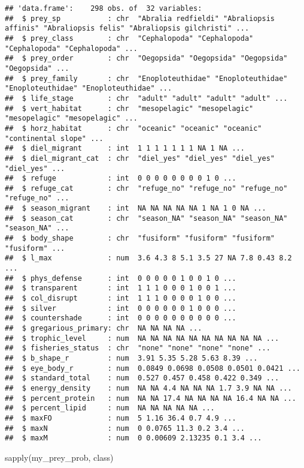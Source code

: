 \documentclass[
]{article}
\newenvironment{Shaded}{\begin{snugshade}}{\end{snugshade}}
\newcommand{\FunctionTok}[1]{\textcolor[rgb]{0.00,0.00,0.00}{#1}}
\newcommand{\NormalTok}[1]{#1}
\begin{document}
\begin{verbatim}
## 'data.frame':    298 obs. of  32 variables:
##  $ prey_sp           : chr  "Abralia redfieldi" "Abraliopsis affinis" "Abraliopsis felis" "Abraliopsis gilchristi" ...
##  $ prey_class        : chr  "Cephalopoda" "Cephalopoda" "Cephalopoda" "Cephalopoda" ...
##  $ prey_order        : chr  "Oegopsida" "Oegopsida" "Oegopsida" "Oegopsida" ...
##  $ prey_family       : chr  "Enoploteuthidae" "Enoploteuthidae" "Enoploteuthidae" "Enoploteuthidae" ...
##  $ life_stage        : chr  "adult" "adult" "adult" "adult" ...
##  $ vert_habitat      : chr  "mesopelagic" "mesopelagic" "mesopelagic" "mesopelagic" ...
##  $ horz_habitat      : chr  "oceanic" "oceanic" "oceanic" "continental slope" ...
##  $ diel_migrant      : int  1 1 1 1 1 1 1 NA 1 NA ...
##  $ diel_migrant_cat  : chr  "diel_yes" "diel_yes" "diel_yes" "diel_yes" ...
##  $ refuge            : int  0 0 0 0 0 0 0 0 1 0 ...
##  $ refuge_cat        : chr  "refuge_no" "refuge_no" "refuge_no" "refuge_no" ...
##  $ season_migrant    : int  NA NA NA NA NA 1 NA 1 0 NA ...
##  $ season_cat        : chr  "season_NA" "season_NA" "season_NA" "season_NA" ...
##  $ body_shape        : chr  "fusiform" "fusiform" "fusiform" "fusiform" ...
##  $ l_max             : num  3.6 4.3 8 5.1 3.5 27 NA 7.8 0.43 8.2 ...
##  $ phys_defense      : int  0 0 0 0 0 1 0 0 1 0 ...
##  $ transparent       : int  1 1 1 0 0 0 1 0 0 1 ...
##  $ col_disrupt       : int  1 1 1 0 0 0 0 1 0 0 ...
##  $ silver            : int  0 0 0 0 0 0 1 0 0 0 ...
##  $ countershade      : int  0 0 0 0 0 0 0 0 0 0 ...
##  $ gregarious_primary: chr  NA NA NA NA ...
##  $ trophic_level     : num  NA NA NA NA NA NA NA NA NA NA ...
##  $ fisheries_status  : chr  "none" "none" "none" "none" ...
##  $ b_shape_r         : num  3.91 5.35 5.28 5.63 8.39 ...
##  $ eye_body_r        : num  0.0849 0.0698 0.0508 0.0501 0.0421 ...
##  $ standard_total    : num  0.527 0.457 0.458 0.422 0.349 ...
##  $ energy_density    : num  NA NA 4.4 NA NA NA 1.7 3.9 NA NA ...
##  $ percent_protein   : num  NA NA 17.4 NA NA NA NA 16.4 NA NA ...
##  $ percent_lipid     : num  NA NA NA NA NA ...
##  $ maxFO             : num  5 1.16 36.4 0.7 4.9 ...
##  $ maxN              : num  0 0.0765 11.3 0.2 3.4 ...
##  $ maxM              : num  0 0.00609 2.13235 0.1 3.4 ...
\end{verbatim}

\begin{Shaded}
\begin{Highlighting}[]
\FunctionTok{sapply}\NormalTok{(my\_prey\_prob, class)}
\end{Highlighting}
\end{Shaded}
\end{document}
